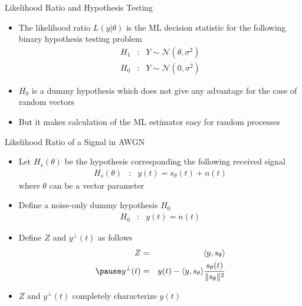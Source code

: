 \documentclass[t]{beamer}
\begin{document}
\begin{frame}{Likelihood Ratio and Hypothesis Testing}
  \footnotesize
  \begin{itemize}
    \item The likelihood ratio $L(y|\theta)$ is the ML decision statistic for the following binary hypothesis testing problem
      \begin{equation*}
        \begin{array}{lcl}
            H_1 & : & Y \sim \mathcal{N}(\theta, \sigma^2) \\
            H_0 & : & Y \sim \mathcal{N}(0, \sigma^2) 
        \end{array}
      \end{equation*}
    \item \pause $H_0$ is a dummy hypothesis which does not give any advantage for the case of random vectors
    \item \pause But it makes calculation of the ML estimator easy for random processes
  \end{itemize}
  \normalsize
\end{frame}

\begin{frame}{Likelihood Ratio of a Signal in AWGN}
  \footnotesize
  \begin{itemize}
    \item Let $H_s(\theta)$ be the hypothesis corresponding the following received signal
      \begin{equation*}
        \begin{array}{lcl}
          H_s(\theta) & : & y(t) = s_\theta(t) + n(t)
        \end{array}
      \end{equation*}
      where $\theta$ can be a vector parameter
    \item \pause Define a noise-only dummy hypothesis $H_0$
      \begin{equation*}
        \begin{array}{lcl}
          H_0 & : & y(t) = n(t)
        \end{array}
      \end{equation*}
    \item \pause Define $Z$ and $y^\perp(t)$ as follows
      \begin{eqnarray*}
        Z & = & \langle y, s_\theta\rangle \\ \pause
        y^\perp(t) & = & y(t) -\langle y, s_\theta\rangle \frac{s_\theta(t)}{\lVert s_\theta\rVert^2}
      \end{eqnarray*}
    \item \pause $Z$ and $y^\perp(t)$ completely characterize $y(t)$
  \end{itemize}
  \normalsize
\end{frame}
\end{document}
